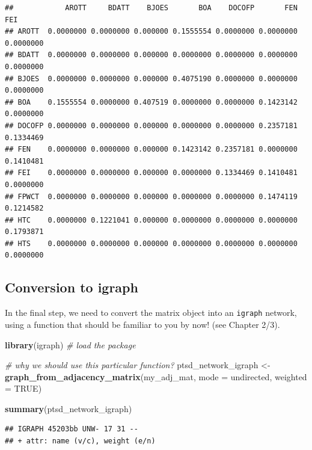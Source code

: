 \documentclass[
]{book}
\newenvironment{Shaded}{\begin{snugshade}}{\end{snugshade}}
\newcommand{\AttributeTok}[1]{\textcolor[rgb]{0.13,0.29,0.53}{#1}}
\newcommand{\CommentTok}[1]{\textcolor[rgb]{0.56,0.35,0.01}{\textit{#1}}}
\newcommand{\ConstantTok}[1]{\textcolor[rgb]{0.56,0.35,0.01}{#1}}
\newcommand{\FunctionTok}[1]{\textcolor[rgb]{0.13,0.29,0.53}{\textbf{#1}}}
\newcommand{\NormalTok}[1]{#1}
\newcommand{\OtherTok}[1]{\textcolor[rgb]{0.56,0.35,0.01}{#1}}
\newcommand{\StringTok}[1]{\textcolor[rgb]{0.31,0.60,0.02}{#1}}
\begin{document}
\begin{verbatim}
##            AROTT     BDATT    BJOES       BOA    DOCOFP       FEN       FEI
## AROTT  0.0000000 0.0000000 0.000000 0.1555554 0.0000000 0.0000000 0.0000000
## BDATT  0.0000000 0.0000000 0.000000 0.0000000 0.0000000 0.0000000 0.0000000
## BJOES  0.0000000 0.0000000 0.000000 0.4075190 0.0000000 0.0000000 0.0000000
## BOA    0.1555554 0.0000000 0.407519 0.0000000 0.0000000 0.1423142 0.0000000
## DOCOFP 0.0000000 0.0000000 0.000000 0.0000000 0.0000000 0.2357181 0.1334469
## FEN    0.0000000 0.0000000 0.000000 0.1423142 0.2357181 0.0000000 0.1410481
## FEI    0.0000000 0.0000000 0.000000 0.0000000 0.1334469 0.1410481 0.0000000
## FPWCT  0.0000000 0.0000000 0.000000 0.0000000 0.0000000 0.1474119 0.1214582
## HTC    0.0000000 0.1221041 0.000000 0.0000000 0.0000000 0.0000000 0.1793871
## HTS    0.0000000 0.0000000 0.000000 0.0000000 0.0000000 0.0000000 0.0000000
\end{verbatim}

\subsection{Conversion to igraph}\label{conversion-to-igraph}

In the final step, we need to convert the matrix object into an \texttt{igraph} network, using a function that should be familiar to you by now! (see Chapter 2/3).

\begin{Shaded}
\begin{Highlighting}[]
\FunctionTok{library}\NormalTok{(igraph) }\CommentTok{\# load the package}

\CommentTok{\# why we should use this particular function? }
\NormalTok{ptsd\_network\_igraph }\OtherTok{\textless{}{-}} \FunctionTok{graph\_from\_adjacency\_matrix}\NormalTok{(my\_adj\_mat, }
                                                   \AttributeTok{mode =} \StringTok{\textquotesingle{}undirected\textquotesingle{}}\NormalTok{, }
                                                   \AttributeTok{weighted =} \ConstantTok{TRUE}\NormalTok{)}

\FunctionTok{summary}\NormalTok{(ptsd\_network\_igraph)}
\end{Highlighting}
\end{Shaded}

\begin{verbatim}
## IGRAPH 45203bb UNW- 17 31 -- 
## + attr: name (v/c), weight (e/n)
\end{verbatim}
\end{document}
